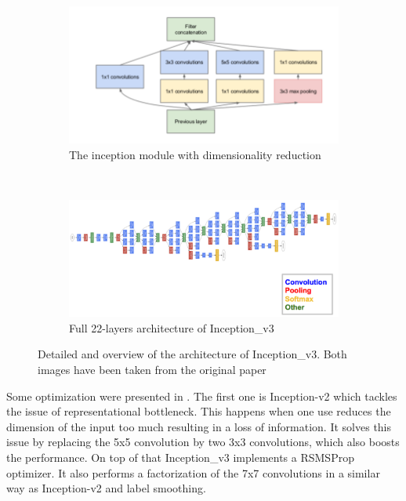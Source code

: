 \begin{figure}
\begin{subfigure}[b]{.8\textwidth}
  \centering
  \includegraphics[width=1\linewidth]{figures/02-inception_module}
  \caption{The inception module with dimensionality reduction }
  \label{fig:inception}
\end{subfigure}
\\
\begin{subfigure}[b]{.8\textwidth}
  \centering
  \includegraphics[width=1\linewidth]{figures/02-googlearch}
  \caption{Full 22-layers architecture of Inception\_v3}
  \label{fig:googl}
\end{subfigure}
\caption[Inception network architecture]{Detailed and overview of the architecture of Inception\_v3. Both images have been taken from the original paper \cite{googlepaper}}
\end{figure}
Some optimization were presented in \cite{googlepaper}. The first one is Inception-v2 which tackles the issue of representational bottleneck. This happens when one use reduces the dimension of the input too much resulting in a loss of information. It solves this issue by replacing the 5x5 convolution by two 3x3 convolutions, which also boosts the performance. On top of that Inception\_v3 implements a RSMSProp optimizer. It also performs a factorization of the 7x7 convolutions in a similar way as Inception-v2 and label smoothing. 

